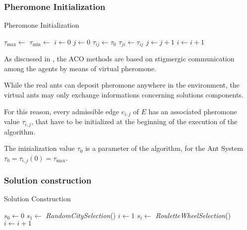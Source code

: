 \begin{homeworkProblem}
\subsubsection{Pheromone Initialization}
\begin{algorithm}[!h]
  \caption{Pheromone Initialization}\label{init}
  \begin{algorithmic}[1]
      \State $\tau_{\max} \gets $
      \State $\tau_{\min} \gets $
      \State $i \gets 0$
      \State $j \gets 0$
          \State $\tau_{ij} \gets \tau_0$
          \State $\tau_{ji} \gets \tau_{ij}$
          \State $ j \gets j + 1$  
        \EndFor
        \State $ i \gets i + 1$ 
      \EndFor
    \EndProcedure
\end{algorithmic}
\end{algorithm}

As discussed in , the ACO methods are based on stigmergic communication among the agents by means of virtual pheromone.

While the real ants can deposit pheromone anywhere in the environment, the virtual ants may only exchange informations concerning solutions components.

For this reason, every admissible edge $e_{i,j}$ of $E$ has an associated pheromone value $\tau_{i,j}$, that have to be initialized at the beginning of the execution of the algorithm.

The inizialization value $\tau_0$ is a parameter of the algorithm, for the \maxmin Ant System $\tau_0 = \tau_{i,j}(0) = \tau_{\max}$. 


\subsubsection{Solution construction}
\begin{algorithm}[!h]
  \caption{Solution Construction}\label{sol}
  \begin{algorithmic}[1]
      \State {}
      \State $s_0 \gets 0$ 
      \State $s_1 \gets$ \emph{RandomCitySelection}() 
      \State $i \gets 1$
        \State $s_i \gets $ \emph{RouletteWheelSelection}()  
        \State $i \gets i+1$
      \EndWhile
    \EndProcedure
\end{algorithmic}
\end{algorithm}


\end{homeworkProblem}
